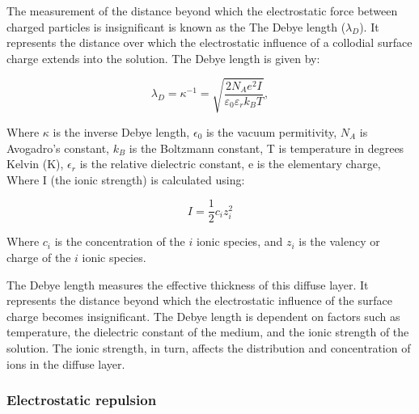 The measurement of the distance beyond which the electrostatic force between charged particles is insignificant is known as the The Debye length ($\lambda_D$). It represents the distance over which the electrostatic influence of a collodial surface charge extends into the solution. The Debye length is given by:

\begin{equation}
    \lambda_D = \kappa^{-1} = \sqrt{\frac{2 N_A e^2 I}{\varepsilon_0 \varepsilon_r k_B T}},
\end{equation}

Where $\kappa$ is the inverse Debye length,  $\epsilon_0$ is the vacuum permitivity, $N_A$ is Avogadro's constant, $k_B$ is the Boltzmann constant, T is temperature in degrees Kelvin (K), $\epsilon_r$ is the relative dielectric constant, e is the elementary charge, Where I (the ionic strength) is calculated using:

\begin{equation} 
I = \frac{1}{2} c_i z_i^2
\end{equation}

Where $c_i$ is the concentration of the $i$ ionic species, and $z_i$ is the valency or charge of the $i$ ionic species.

The Debye length measures the effective thickness of this diffuse layer. It represents the distance beyond which the electrostatic influence of the surface charge becomes insignificant. The Debye length is dependent on factors such as temperature, the dielectric constant of the medium, and the ionic strength of the solution. The ionic strength, in turn, affects the distribution and concentration of ions in the diffuse layer.



\subsubsection{Electrostatic repulsion}


